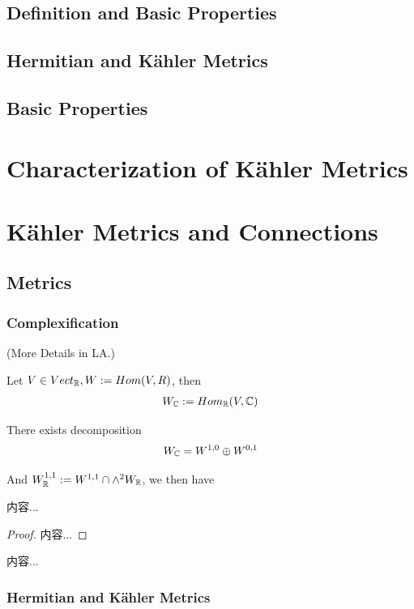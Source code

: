 \documentclass[Total.tex]{subfiles}
\begin{document}
			\subsection{Definition and Basic Properties}
			\subsection{Hermitian and Kähler Metrics}
			\subsection{Basic Properties}
		\section{Characterization of Kähler Metrics}
		\section{Kähler Metrics and Connections}
			\subsection{Metrics}
			\subsubsection{Complexification}
				
				(More Details in LA.)
				
				Let $V\in Vect_{\mathbb{R}},W:=Hom(V,R)$, then
				\begin{gather*}
					W_{\mathbb{C}}:=Hom_{\mathbb{R}}(V,\mathbb{C})
				\end{gather*}
				
				There exists decomposition
				\begin{gather*}
					W_{\mathbb{C}}=W^{1,0}\oplus W^{0,1}
				\end{gather*}
				
				And $W_{\mathbb{R}}^{1,1}:=W^{1,1}\cap \wedge^2 W_{\mathbb{R}}$, we then have
				\begin{lemma}
					内容...
				\end{lemma}
				\begin{proof}
					内容...
				\end{proof}
				
				\begin{Def}
					内容...
				\end{Def}
			\subsubsection{Hermitian and K\"{a}hler Metrics}
\end{document}
